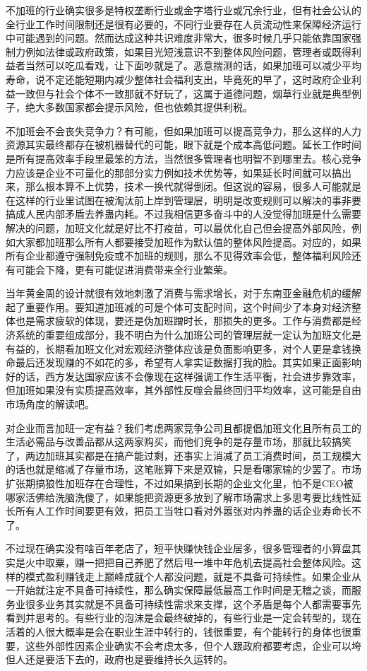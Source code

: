 \documentclass[]{book}
\begin{document}
不加班的行业确实很多是特权垄断行业或金字塔行业或冗余行业，但有社会公认的全行业工作时间限制还是很有必要的，不同行业要存在人员流动性来保障经济运行中可能遇到的问题。然而达成这种共识难度非常大，很多时候几乎只能依靠国家强制力例如法律或政府政策，如果目光短浅意识不到整体风险问题，管理者或既得利益者当然可以吃瓜看戏，让下面吵就是了。恶意揣测的话，如果加班可以减少平均寿命，说不定还能短期内减少整体社会福利支出，毕竟死的早了，这时政府企业利益一致但与社会个体不一致那就不好玩了，这属于道德问题，烟草行业就是典型例子，绝大多数国家都会提示风险，但也依赖其提供利税。

不加班会不会丧失竞争力？有可能，但如果加班可以提高竞争力，那么这样的人力资源其实最终都存在被机器替代的可能，眼下就是个成本高低问题。延长工作时间是所有提高效率手段里最笨的方法，当然很多管理者也明智不到哪里去。核心竞争力应该是企业不可量化的那部分实力例如技术优势等，如果延长时间就可以搞出来，那么根本算不上优势，技术一换代就得倒闭。但这说的容易，很多人可能就是在这样的行业里试图在被淘汰前上岸到管理层，明明是改变规则可以解决的事非要搞成人民内部矛盾去养蛊内耗。不过我相信更多奋斗中的人没觉得加班是什么需要解决的问题，加班文化就是好比不打疫苗，可以最优化自己但会提高外部风险，例如大家都加班那么所有人都要接受加班作为默认值的整体风险提高。对应的，如果所有企业都遵守强制免疫或不加班的规则，那么不见得效率会低，整体福利风险还有可能会下降，更有可能促进消费带来全行业繁荣。

当年黄金周的设计就很有效地刺激了消费与需求增长，对于东南亚金融危机的缓解起了重要作用。要知道加班减的可是个体可支配时间，这个时间少了本身对经济整体也是需求疲软的体现，要还是伪加班蹭时长，那损失的更多。工作与消费都是经济系统的重要组成部分，我不明白为什么加班公司的管理层就一定认为加班文化是有益的，长期看加班文化对宏观经济整体应该是负面影响更多，对个人更是拿钱换命最后还发现赚的不如花的多，希望有人拿实证数据打我的脸。其实如果正面影响好的话，西方发达国家应该不会像现在这样强调工作生活平衡，社会进步靠效率，但加班如果没有实质提高效率，其外部性反噬会最终回归平均效率，这可能是自由市场角度的解读吧。

对企业而言加班一定有益？我们考虑两家竞争公司且都提倡加班文化且所有员工的生活必需品与改善品都从这两家购买，而他们竞争的是存量市场，那就比较搞笑了，两边加班其实都是在搞产能过剩，还事实上消减了员工消费时间，员工规模大的话也就是缩减了存量市场，这笔账算下来是双输，只是看哪家输的少罢了。市场扩张期搞狼性加班存在合理性，不过如果搞到长期的企业文化里，怕不是CEO被哪家活佛给洗脑洗傻了，如果能把资源更多放到了解市场需求上多思考要比线性延长所有人工作时间要更有效，把员工当牲口看对外嚣张对内养蛊的话企业寿命长不了。

不过现在确实没有啥百年老店了，短平快赚快钱企业居多，很多管理者的小算盘其实是火中取粟，赚一把把自己养肥了然后甩一堆中年危机去提高社会整体风险。这样的模式盈利赚钱走上巅峰成就个人都没问题，就是不具备可持续性。如果企业从一开始就注定不具备可持续性，那么确实保障最低最高工作时间是无稽之谈，而服务业很多业务其实就是不具备可持续性需求来支撑，这个矛盾是每个人都需要事先看到并思考的。有些行业的泡沫是会最终破掉的，有些行业是一定会转型的，现在活着的人很大概率是会在职业生涯中转行的，钱很重要，有个能转行的身体也很重要，这些外部性因素企业确实不会考虑太多，但个人跟政府都要考虑，企业可以垮但人还是要活下去的，政府也是要维持长久运转的。
\end{document}
